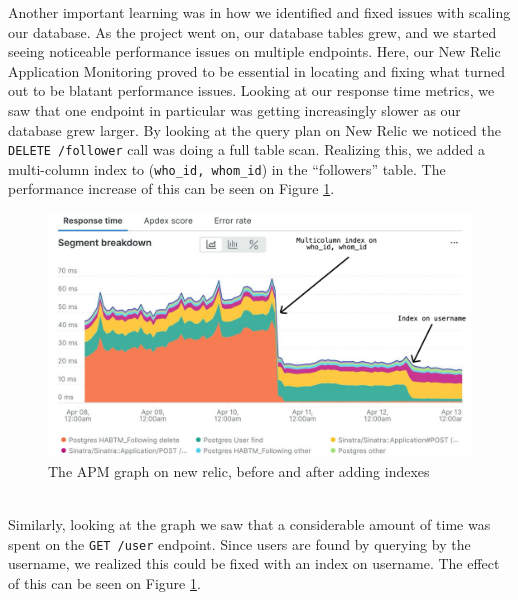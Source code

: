 \documentclass{article}
\begin{document}
Another important learning was in how we identified and fixed issues with scaling our database. As the project went on, our database tables grew, and we started seeing noticeable performance issues on multiple endpoints. Here, our New Relic Application Monitoring proved to be essential in locating and fixing what turned out to be blatant performance issues. Looking at our response time metrics, we saw that one endpoint in particular was getting increasingly slower as our database grew larger. By looking at the query plan on New Relic we noticed the \texttt{DELETE /follower} call was doing a full table scan. Realizing this, we added a multi-column index to (\texttt{who\_id, whom\_id}) in the ``followers'' table. The performance increase of this can be seen on Figure \ref{fig:index_apm}.
\begin{figure}[h]
    \centering
    \includegraphics[width=\textwidth]{images/index_apm.png}
    \caption{The APM graph on new relic, before and after adding indexes}
    \label{fig:index_apm}
\end{figure}
\\Similarly, looking at the graph we saw that a considerable amount of time was spent on the \texttt{GET /user} endpoint. Since users are found by querying by the username, we realized this could be fixed with an index on username. The effect of this can be seen on Figure \ref{fig:index_apm}.
\end{document}
